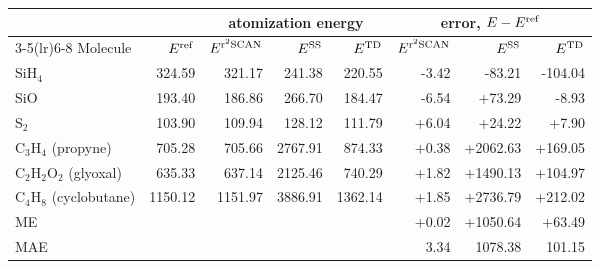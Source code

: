 \begin{tabular}{@{}l rrrr rrr@{}}
\toprule
 &  & \multicolumn{3}{c}{atomization energy} & \multicolumn{3}{c}{error, $E-E^{\rm ref}$} \\
\cmidrule(lr){3-5}\cmidrule(lr){6-8}
Molecule & $E^{\rm ref}$ & $E^{{\rm r}^2{\rm SCAN}}$ & $E^{\rm SS}$ & $E^{\rm TD}$ & $E^{{\rm r}^2{\rm SCAN}}$ & $E^{\rm SS}$ & $E^{\rm TD}$ \\
\midrule
SiH$_4$ & 324.59 & \textcolor{pyscfred}{321.17} & \textcolor{pyscfred}{241.38} & \textcolor{pyscfred}{220.55} & \textcolor{pyscfred}{-3.42} & \textcolor{pyscfred}{-83.21} & \textcolor{pyscfred}{-104.04} \\
SiO & 193.40 & \textcolor{pyscfred}{186.86} & \textcolor{pyscfred}{266.70} & \textcolor{pyscfred}{184.47} & \textcolor{pyscfred}{-6.54} & \textcolor{pyscfred}{+73.29} & \textcolor{pyscfred}{-8.93} \\
S$_2$ & 103.90 & \textcolor{pyscfred}{109.94} & \textcolor{pyscfred}{128.12} & \textcolor{pyscfred}{111.79} & \textcolor{pyscfred}{+6.04} & \textcolor{pyscfred}{+24.22} & \textcolor{pyscfred}{+7.90} \\
C$_3$H$_4$ (propyne) & 705.28 & \textcolor{pyscfred}{705.66} & \textcolor{pyscfred}{2767.91} & \textcolor{pyscfred}{874.33} & \textcolor{pyscfred}{+0.38} & \textcolor{pyscfred}{+2062.63} & \textcolor{pyscfred}{+169.05} \\
C$_2$H$_2$O$_2$ (glyoxal) & 635.33 & \textcolor{pyscfred}{637.14} & \textcolor{pyscfred}{2125.46} & \textcolor{pyscfred}{740.29} & \textcolor{pyscfred}{+1.82} & \textcolor{pyscfred}{+1490.13} & \textcolor{pyscfred}{+104.97} \\
C$_4$H$_8$ (cyclobutane) & 1150.12 & \textcolor{pyscfred}{1151.97} & \textcolor{pyscfred}{3886.91} & \textcolor{pyscfred}{1362.14} & \textcolor{pyscfred}{+1.85} & \textcolor{pyscfred}{+2736.79} & \textcolor{pyscfred}{+212.02} \\
\midrule
ME &  &  &  &  & \textcolor{pyscfred}{+0.02} & \textcolor{pyscfred}{+1050.64} & \textcolor{pyscfred}{+63.49} \\
MAE &  &  &  &  & \textcolor{pyscfred}{3.34} & \textcolor{pyscfred}{1078.38} & \textcolor{pyscfred}{101.15} \\
\bottomrule
\end{tabular}
